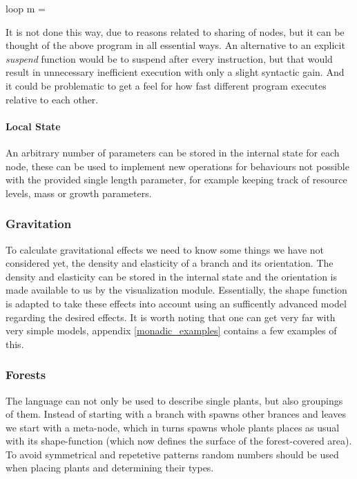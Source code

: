 \begin{haskell*}
loop m = 
\end{haskell*}

    It is not done this way, due to reasons related to sharing of
    nodes, but it can be thought of the above program in all essential
    ways.
    An alternative to an explicit \emph{suspend} function would be to
    suspend after every instruction, but that would result in
    unnecessary inefficient execution with only a slight syntactic
    gain. And it could be problematic to get a feel for how fast
    different program executes relative to each other.

\paragraph{Local State}

    An arbitrary number of parameters can be stored in the internal
    state for each node, these can be used to implement new operations
    for behaviours not possible with the provided single length
    parameter, for example keeping track of resource levels, mass or
    growth parameters.


\subsubsection{Gravitation}

    To calculate gravitational effects we need to know some
    things we have not considered yet, the density and
    elasticity of a branch and its orientation. The density
    and elasticity can be stored in the internal state and
    the orientation is made available to us by the visualization
    module. Essentially, the shape function is adapted to take these
    effects into account using an sufficently advanced model regarding
    the desired effects. It is worth noting that one can get very far
    with very simple models, appendix \ref{monadic_examples} contains
    a few examples of this.


\subsubsection{Forests}

    The language can not only be used to describe single plants, but
    also groupings of them. Instead of starting with a branch with
    spawns other brances and leaves we start with a meta-node, which
    in turns spawns whole plants places as usual with its
    shape-function (which now defines the surface of the
    forest-covered area).
    To avoid symmetrical and repetetive patterns random numbers should
    be used when placing plants and determining their types.


